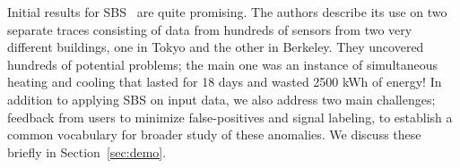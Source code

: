 Initial results for SBS~\cite{sbs:ipsn2013} are quite promising.  The authors describe its use on two separate traces consisting of data
from hundreds of sensors from two very different buildings, one in Tokyo and the other in Berkeley.   They uncovered hundreds
of potential problems; the main one was an instance of simultaneous heating and cooling that lasted for 18 days and wasted 2500 kWh of
energy!  In addition to applying SBS on input data, we also address two main challenges; feedback from users to minimize false-positives
and signal labeling, to establish a common vocabulary for broader study of these anomalies.  We discuss these briefly in Section~\ref{sec:demo}.


